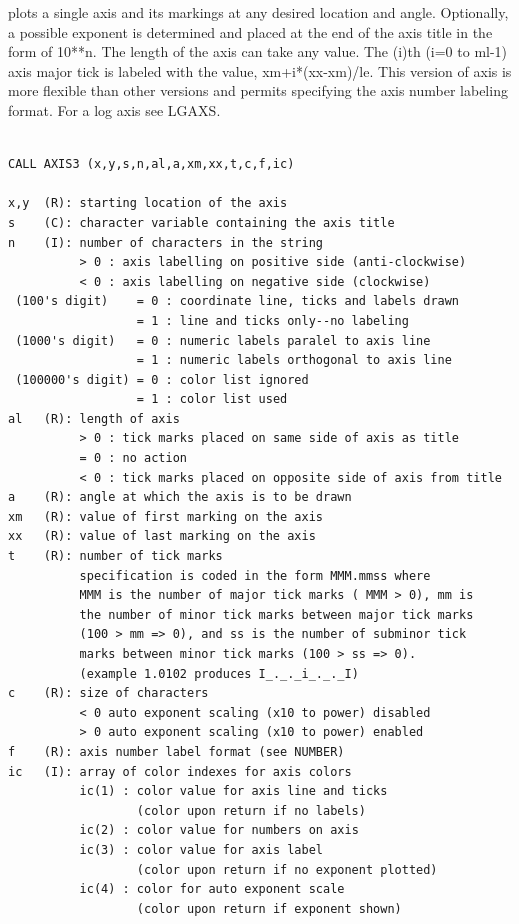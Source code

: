 \documentclass[11pt]{report}
\begin{document}
 plots a single axis and its markings at any desired location and
angle.  Optionally, a possible exponent
is determined and placed at the end of the axis title in the form
of 10**n.  The length of the axis can take any value.  The (i)th (i=0 to ml-1)
axis major tick is labeled with the value, xm+i*(xx-xm)/le.
This version of axis is more flexible than other versions
and permits specifying the axis number labeling format.
For a log axis see LGAXS.
\begin{verbatim}

CALL AXIS3 (x,y,s,n,al,a,xm,xx,t,c,f,ic)

x,y  (R): starting location of the axis
s    (C): character variable containing the axis title
n    (I): number of characters in the string
          > 0 : axis labelling on positive side (anti-clockwise)
          < 0 : axis labelling on negative side (clockwise)
 (100's digit)    = 0 : coordinate line, ticks and labels drawn
                  = 1 : line and ticks only--no labeling
 (1000's digit)   = 0 : numeric labels paralel to axis line
                  = 1 : numeric labels orthogonal to axis line
 (100000's digit) = 0 : color list ignored
                  = 1 : color list used
al   (R): length of axis 
          > 0 : tick marks placed on same side of axis as title
          = 0 : no action
          < 0 : tick marks placed on opposite side of axis from title
a    (R): angle at which the axis is to be drawn 
xm   (R): value of first marking on the axis
xx   (R): value of last marking on the axis
t    (R): number of tick marks 
          specification is coded in the form MMM.mmss where
          MMM is the number of major tick marks ( MMM > 0), mm is
          the number of minor tick marks between major tick marks
          (100 > mm => 0), and ss is the number of subminor tick
          marks between minor tick marks (100 > ss => 0).
          (example 1.0102 produces I_._._i_._._I)
c    (R): size of characters 
          < 0 auto exponent scaling (x10 to power) disabled
          > 0 auto exponent scaling (x10 to power) enabled
f    (R): axis number label format (see NUMBER)
ic   (I): array of color indexes for axis colors
          ic(1) : color value for axis line and ticks
                  (color upon return if no labels)
          ic(2) : color value for numbers on axis
          ic(3) : color value for axis label 
                  (color upon return if no exponent plotted)
          ic(4) : color for auto exponent scale
                  (color upon return if exponent shown)
\end{verbatim}
\end{document}

